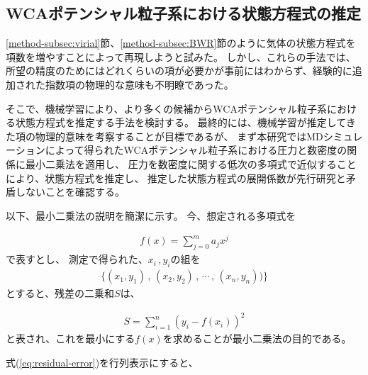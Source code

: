 \documentclass[titlepage]{jsreport}
\begin{document}
{{{\subsection{WCAポテンシャル粒子系における状態方程式の推定}\label{method-subsec:WCA-equation}
\ref{method-subsec:virial}節、\ref{method-subsec:BWR}節のように気体の状態方程式を項数を増やすことによって再現しようと試みた。
しかし、これらの手法では、所望の精度のためにはどれくらいの項が必要かが事前にはわからず、経験的に追加された指数項の物理的な意味も不明瞭であった。


そこで、機械学習により、より多くの候補からWCAポテンシャル粒子系における状態方程式を推定する手法を検討する。
最終的には、機械学習が推定してきた項の物理的意味を考察することが目標であるが、
まず本研究ではMDシミュレーションによって得られたWCAポテンシャル粒子系における圧力と数密度の関係に最小二乗法を適用し、
圧力を数密度に関する低次の多項式で近似することにより、状態方程式を推定し、
推定した状態方程式の展開係数が先行研究と矛盾しないことを確認する。

以下、最小二乗法の説明を簡潔に示す。
今、想定される多項式を

\large
\begin{eqnarray}
f(x)=\sum_{j=0}^m a_jx^j \nonumber
\end{eqnarray}
\normalsize
で表すとし、
測定で得られた、$x_i$\,,\,$y_i$の組を
\large
\begin{eqnarray}
\{(x_1,y_1)\,,\,(x_2,y_2)\,,\,\cdots\,,\,(x_n,y_n)) \}\nonumber
\end{eqnarray}
\normalsize
とすると、残差の二乗和$S$は、

\large
\begin{eqnarray}
S=\sum_{i=1}^n (y_i-f(x_i))^2\label{eq:residual-error}
\end{eqnarray}
\normalsize
と表され、これを最小にする$f(x)$を求めることが最小二乗法の目的である。


式(\ref{eq:residual-error})を行列表示にすると、

}}}
\end{document}
